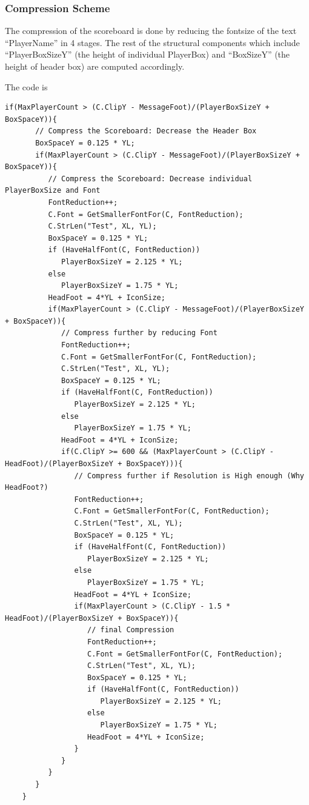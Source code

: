 \documentclass{article}
\begin{document}
\subsubsection{Compression Scheme}
The  compression of the scoreboard is done by reducing the fontsize of the text ``PlayerName'' in 4 stages.  The rest of the structural components which include ``PlayerBoxSizeY'' (the height of individual PlayerBox) and ``BoxSizeY'' (the height of header box) are computed accordingly.

The code is 
\begin{lstlisting}[frame=single]
  if(MaxPlayerCount > (C.ClipY - MessageFoot)/(PlayerBoxSizeY + BoxSpaceY)){
	   // Compress the Scoreboard: Decrease the Header Box
	   BoxSpaceY = 0.125 * YL;
	   if(MaxPlayerCount > (C.ClipY - MessageFoot)/(PlayerBoxSizeY + BoxSpaceY)){
	      // Compress the Scoreboard: Decrease individual PlayerBoxSize and Font
	      FontReduction++;
	      C.Font = GetSmallerFontFor(C, FontReduction);
	      C.StrLen("Test", XL, YL);
	      BoxSpaceY = 0.125 * YL;
	      if (HaveHalfFont(C, FontReduction))
	         PlayerBoxSizeY = 2.125 * YL;
	      else
	         PlayerBoxSizeY = 1.75 * YL;
	      HeadFoot = 4*YL + IconSize;
          if(MaxPlayerCount > (C.ClipY - MessageFoot)/(PlayerBoxSizeY + BoxSpaceY)){
             // Compress further by reducing Font
             FontReduction++;
             C.Font = GetSmallerFontFor(C, FontReduction);
	         C.StrLen("Test", XL, YL);
	         BoxSpaceY = 0.125 * YL;
	         if (HaveHalfFont(C, FontReduction))
	            PlayerBoxSizeY = 2.125 * YL;
	         else
	            PlayerBoxSizeY = 1.75 * YL;
	         HeadFoot = 4*YL + IconSize;
	         if(C.ClipY >= 600 && (MaxPlayerCount > (C.ClipY - HeadFoot)/(PlayerBoxSizeY + BoxSpaceY))){
	            // Compress further if Resolution is High enough (Why HeadFoot?)
	            FontReduction++;
                C.Font = GetSmallerFontFor(C, FontReduction);
	            C.StrLen("Test", XL, YL);
	            BoxSpaceY = 0.125 * YL;
	            if (HaveHalfFont(C, FontReduction))
	               PlayerBoxSizeY = 2.125 * YL;
	            else
	               PlayerBoxSizeY = 1.75 * YL;
	            HeadFoot = 4*YL + IconSize;
	            if(MaxPlayerCount > (C.ClipY - 1.5 * HeadFoot)/(PlayerBoxSizeY + BoxSpaceY)){
                   // final Compression
                   FontReduction++;
                   C.Font = GetSmallerFontFor(C, FontReduction);
	               C.StrLen("Test", XL, YL);
	               BoxSpaceY = 0.125 * YL;
	               if (HaveHalfFont(C, FontReduction))
	                  PlayerBoxSizeY = 2.125 * YL;
	               else
	                  PlayerBoxSizeY = 1.75 * YL;
	               HeadFoot = 4*YL + IconSize;
                }
             }
          }
       }
    }
\end{lstlisting}
\end{document}
